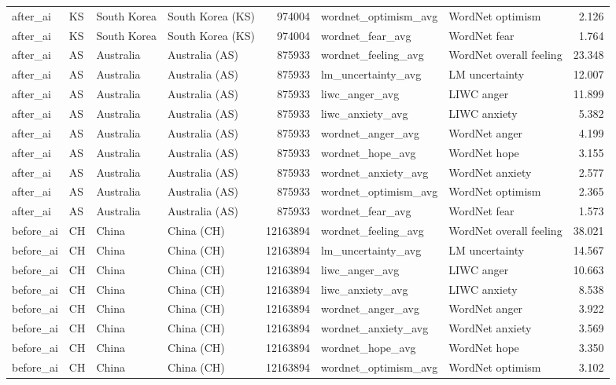 \begin{tabular}{llllrllr}
after\_ai & KS & South Korea & South Korea (KS) & 974004 & wordnet\_optimism\_avg & WordNet optimism & 2.126 \\
after\_ai & KS & South Korea & South Korea (KS) & 974004 & wordnet\_fear\_avg & WordNet fear & 1.764 \\
after\_ai & AS & Australia & Australia (AS) & 875933 & wordnet\_feeling\_avg & WordNet overall feeling & 23.348 \\
after\_ai & AS & Australia & Australia (AS) & 875933 & lm\_uncertainty\_avg & LM uncertainty & 12.007 \\
after\_ai & AS & Australia & Australia (AS) & 875933 & liwc\_anger\_avg & LIWC anger & 11.899 \\
after\_ai & AS & Australia & Australia (AS) & 875933 & liwc\_anxiety\_avg & LIWC anxiety & 5.382 \\
after\_ai & AS & Australia & Australia (AS) & 875933 & wordnet\_anger\_avg & WordNet anger & 4.199 \\
after\_ai & AS & Australia & Australia (AS) & 875933 & wordnet\_hope\_avg & WordNet hope & 3.155 \\
after\_ai & AS & Australia & Australia (AS) & 875933 & wordnet\_anxiety\_avg & WordNet anxiety & 2.577 \\
after\_ai & AS & Australia & Australia (AS) & 875933 & wordnet\_optimism\_avg & WordNet optimism & 2.365 \\
after\_ai & AS & Australia & Australia (AS) & 875933 & wordnet\_fear\_avg & WordNet fear & 1.573 \\
before\_ai & CH & China & China (CH) & 12163894 & wordnet\_feeling\_avg & WordNet overall feeling & 38.021 \\
before\_ai & CH & China & China (CH) & 12163894 & lm\_uncertainty\_avg & LM uncertainty & 14.567 \\
before\_ai & CH & China & China (CH) & 12163894 & liwc\_anger\_avg & LIWC anger & 10.663 \\
before\_ai & CH & China & China (CH) & 12163894 & liwc\_anxiety\_avg & LIWC anxiety & 8.538 \\
before\_ai & CH & China & China (CH) & 12163894 & wordnet\_anger\_avg & WordNet anger & 3.922 \\
before\_ai & CH & China & China (CH) & 12163894 & wordnet\_anxiety\_avg & WordNet anxiety & 3.569 \\
before\_ai & CH & China & China (CH) & 12163894 & wordnet\_hope\_avg & WordNet hope & 3.350 \\
before\_ai & CH & China & China (CH) & 12163894 & wordnet\_optimism\_avg & WordNet optimism & 3.102 \\

\end{tabular}
